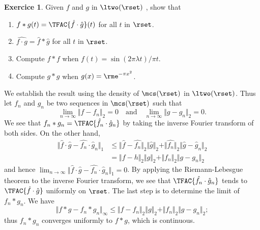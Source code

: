 \documentclass[a4paper,11pt,fleqn]{article}
\theoremstyle{definition}
\newtheorem{exercice}{Exercice}
\begin{document}
\begin{exercice}
Given $f$ and $g$ in $\ltwo(\rset)$ , show that
\begin{enumerate}[label=(\roman*)]
\item $f*g(t)=\TFAC{\hat{f}\cdot\hat{g}}(t)$  for all $t$ in $\rset$. 
\item $\widehat{f\cdot g}=\hat{f}*\hat{g}$ for all $t$  in $\rset$.
\item Compute $f * f$ when $f(t)= \sin(2 \pi \lambda t)/ \pi t$.
\item Compute $g * g$ when $g(x)= \rme^{-\pi x^2}$.
\end{enumerate}
\end{exercice}


We establish the result using the density of $\mcs(\rset)$ in $\ltwo(\rset)$. Thus let $f_{n}$ and $g_{n}$ be two sequences in $\mcs(\rset)$ such that
$$
\lim_{n\rightarrow\infty}\Vert f-f_{n}\Vert_{2}=0 \quad \text{and} \quad \lim_{n\rightarrow\infty}\Vert g -g_{n}\Vert_{2}=0 .
$$
We see that $f_{n}*g_{n}=\TFAC{\hat{f}_{n}\cdot\hat{g}_{n}}$ by taking the inverse Fourier transform of both sides. On the other hand,
\begin{align*}
\Vert\hat{f}\cdot\hat{g}-\hat{f_{n}}\cdot\hat{g}_{n}\Vert_{1}
&\leq\Vert\hat{f}-\hat{f_{n}}\Vert_{2}\Vert\hat{g}\Vert_{2}+\Vert\hat{f_{n}}\Vert_{2}\Vert\hat{g}-\hat{g}_{n}\Vert_{2} \\
&=\Vert f-h\Vert_{2}\Vert g\Vert_{2}+\Vert f_{n}\Vert_{2}\Vert g-g_{n}\Vert_{2}
\end{align*}
and hence $\lim_{n\rightarrow\infty}\Vert\hat{f}\cdot\hat{g}-\hat{f_{n}}\cdot\hat{g}_{n}\Vert_{1}=0$. By applying the Riemann-Lebesgue theorem to the inverse Fourier transform, we see that $\TFAC{\hat{f_{n}}\cdot\hat{g}_{n}}$ tends to $\TFAC{\hat{f}\cdot\hat{g}}$ uniformly on $\rset$. The last step is to determine the limit of $f_{n}*g_{n}$. We have
$$
\Vert f*g-f_{n}*g_{n}\Vert_{\infty}\leq\Vert f-f_{n}\Vert_{2}\Vert g\Vert_{2}+\Vert f_{n}\Vert_{2}\Vert g-g_{n}\Vert_{2};
$$
thus $f_{n}*g_{n}$ converges uniformly to $f*g$, which is continuous. 
\end{document}
